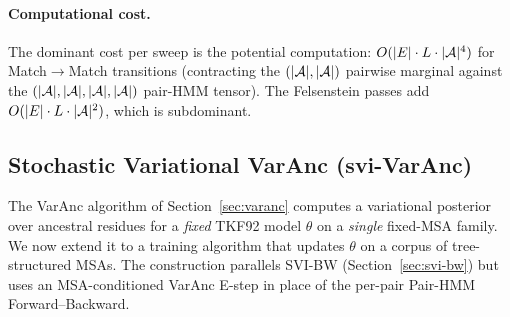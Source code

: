 \paragraph{Computational cost.}
The dominant cost per sweep is the potential computation:
$O(|E| \cdot L \cdot |\mathcal{A}|^4)$ for Match$\to$Match transitions
(contracting the $(|\mathcal{A}|, |\mathcal{A}|)$ pairwise marginal against the
$(|\mathcal{A}|, |\mathcal{A}|, |\mathcal{A}|, |\mathcal{A}|)$ pair-HMM tensor).
The Felsenstein passes add $O(|E| \cdot L \cdot |\mathcal{A}|^2)$, which is subdominant.


\subsection{Stochastic Variational VarAnc (svi-VarAnc)}
\label{sec:svi-varanc}

The VarAnc algorithm of Section~\ref{sec:varanc} computes a variational
posterior over ancestral residues for a \emph{fixed} TKF92 model
$\theta$ on a \emph{single} fixed-MSA family.  We now extend it to a
training algorithm that updates $\theta$ on a corpus of tree-structured
MSAs.  The construction parallels SVI-BW
(Section~\ref{sec:svi-bw}) but uses an MSA-conditioned VarAnc E-step
in place of the per-pair Pair-HMM Forward--Backward.

